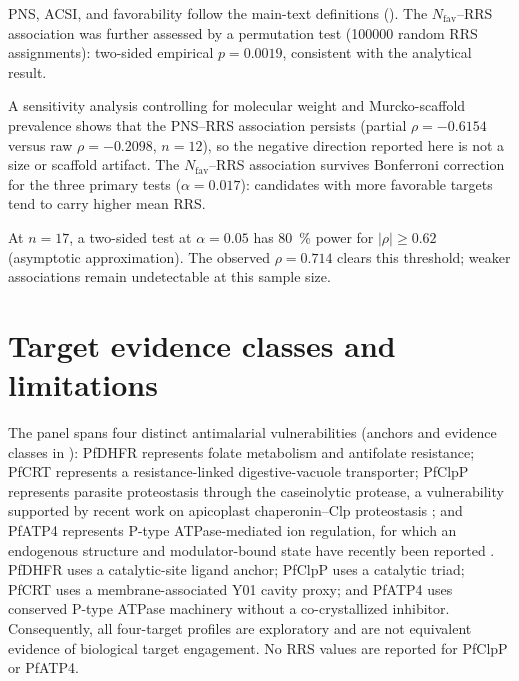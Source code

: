 \documentclass[journal=jcisd8,manuscript=suppinfo]{achemso}
\begin{document}
PNS, ACSI, and favorability follow the main-text definitions (). The $N_{\mathrm{fav}}$--RRS association was further assessed by a permutation test (\num{100000} random RRS assignments): two-sided empirical $p=\num{0.0019}$, consistent with the analytical result.

A sensitivity analysis controlling for molecular weight and Murcko-scaffold prevalence shows that the PNS--RRS association persists (partial $\rho=-\num{0.6154}$ versus raw $\rho=-\num{0.2098}$, $n=\num{12}$), so the negative direction reported here is not a size or scaffold artifact. The $N_{\mathrm{fav}}$--RRS association survives Bonferroni correction for the three primary tests ($\alpha=\num{0.017}$): candidates with more favorable targets tend to carry higher mean RRS.

At $n=\num{17}$, a two-sided test at $\alpha=\num{0.05}$ has \qty{80}{\percent} power for $|\rho|\geq\num{0.62}$ (asymptotic approximation). The observed $\rho=\num{0.714}$ clears this threshold; weaker associations remain undetectable at this sample size.



\section{Target evidence classes and limitations}\label{sec:sm_evidence}
The panel spans four distinct antimalarial vulnerabilities (anchors and evidence classes in ): PfDHFR represents folate metabolism and antifolate resistance; PfCRT represents a resistance-linked digestive-vacuole transporter; PfClpP represents parasite proteostasis through the caseinolytic protease, a vulnerability supported by recent work on apicoplast chaperonin--Clp proteostasis \cite{Tissawak2025}; and PfATP4 represents P-type ATPase-mediated ion regulation, for which an endogenous structure and modulator-bound state have recently been reported \cite{Haile2025}. PfDHFR uses a catalytic-site ligand anchor; PfClpP uses a catalytic triad; PfCRT uses a membrane-associated Y01 cavity proxy; and PfATP4 uses conserved P-type ATPase machinery without a co-crystallized inhibitor. Consequently, all four-target profiles are exploratory and are not equivalent evidence of biological target engagement. No RRS values are reported for PfClpP or PfATP4.
\end{document}
